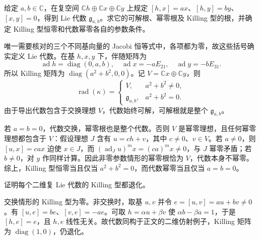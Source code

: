 \begin{exercise}\label{b5:ex:13-zero-killing-not-nilpotent}
	给定 \(a,b\in\mathbb C\)，在复空间 \(\mathbb Ch\oplus\mathbb Cx\oplus\mathbb Cy\) 上规定 \([h,x]=ax\)、\([h,y]=by\)、\([x,y]=0\)，得到 Lie 代数 \(\mathfrak g_{a,b}\)。求它的可解根、幂零根及 Killing 型的根，并确定 Killing 型恒零和代数幂零各自的参数条件。
\end{exercise}
\begin{solution}
	唯一需要核对的三个不同基向量的 Jacobi 恒等式中，各项都为零，故这些括号确实定义 Lie 代数。在基 \(h,x,y\) 下，伴随矩阵为
	\[
		\operatorname{ad}h=\operatorname{diag}(0,a,b),\quad \operatorname{ad}x=-aE_{21},\quad \operatorname{ad}y=-bE_{31}.
	\]
	所以 Killing 矩阵为 \(\operatorname{diag}(a^2+b^2,0,0)\)。记 \(V=\mathbb Cx\oplus\mathbb Cy\)，则
	\[
		\operatorname{rad}(\kappa)=
		\begin{cases}
			V,&a^2+b^2\ne0,\\
			\mathfrak g_{a,b},&a^2+b^2=0.
		\end{cases}
	\]
	由于导出代数包含于交换理想 \(V\)，代数始终可解，可解根就是整个 \(\mathfrak g_{a,b}\)。

	若 \(a=b=0\)，代数交换，幂零根也是整个代数。否则 \(V\) 是幂零理想，且任何幂零理想都包含于 \(V\)：假设理想 \(J\) 含有 \(u=ch+v\)，其中 \(c\ne0\)、\(v\in V\)。若 \(a\ne0\)，则 \([u,x]=cax\) 迫使 \(x\in J\)，而 \((\operatorname{ad}_J u)^m x=(ca)^m x\ne0\)，与 \(J\) 幂零矛盾；若 \(b\ne0\)，对 \(y\) 作同样计算。因此非零参数情形的幂零根恰为 \(V\)，代数本身不幂零。综上，Killing 型恒零当且仅当 \(a^2+b^2=0\)，而代数幂零当且仅当 \(a=b=0\)。
\end{solution}

\begin{exercise}\label{b5:ex:13-two-dimensional-killing}
	证明每个二维复 Lie 代数的 Killing 型都退化。
\end{exercise}
\begin{solution}
	交换情形的 Killing 型为零。非交换时，取基 \(u,v\) 并令 \(e=[u,v]=au+bv\ne0\)。有 \([u,e]=be\)、\([v,e]=-ae\)。可取 \(h=\alpha u+\beta v\) 使 \(\alpha b-\beta a=1\)，于是 \([h,e]=e\)，且 \(h,e\) 线性无关。故代数同构于正文的二维仿射例子，Killing 矩阵为 \(\operatorname{diag}(1,0)\)，仍退化。
\end{solution}

